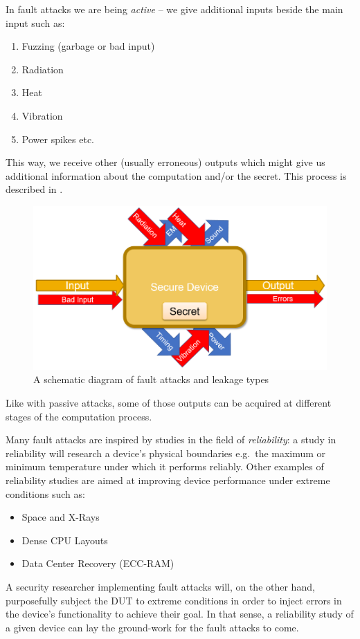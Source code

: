 In fault attacks we are being \emph{active} -- we give additional inputs beside
the main input such as:
\begin{enumerate}
	\item Fuzzing (garbage or bad input)
	\item Radiation
	\item Heat
	\item Vibration
	\item Power spikes etc.
\end{enumerate}

This way, we receive other (usually erroneous) outputs which might give us
additional information about the computation and/or the secret. This process is
described in .

\begin{figure}[!ht]
	\centering
	\includegraphics[width=0.7\linewidth]{images/chapter_9/fault_attacks_schematic.png}
	\caption{A schematic diagram of fault attacks and leakage types}\label{fig:fault_attacks_schematic}
\end{figure}

Like with passive attacks, some of those outputs can be acquired at different
stages of the computation process.

Many fault attacks are inspired by studies in the field of \emph{reliability}: a
study in reliability will research a device's physical boundaries e.g.\ the
maximum or minimum temperature under which it performs reliably. Other examples
of reliability studies are aimed at improving device performance under extreme
conditions such as:
\begin{itemize}
	\item Space and X-Rays
	\item Dense CPU Layouts
	\item Data Center Recovery (ECC-RAM)
\end{itemize}

A security researcher implementing fault attacks will, on the other hand,
purposefully subject the DUT to extreme conditions in order to inject errors in
the device's functionality to achieve their goal. In that sense, a reliability
study of a given device can lay the ground-work for the fault attacks to come.

